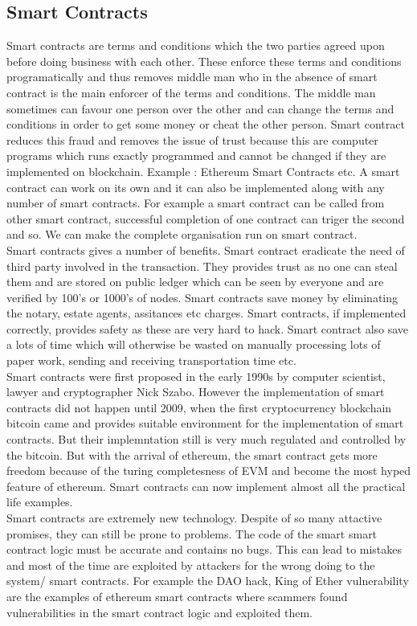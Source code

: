 \documentclass{article}
\begin{document}
\subsection*{Smart Contracts}
Smart contracts are terms and conditions which the two parties agreed upon before doing business with each other. These enforce these terms and conditions programatically and thus removes middle man who in the absence of smart contract is the main enforcer of the terms and conditions. The middle man sometimes can favour one person over the other and can change the terms and conditions in order to get some money or cheat the other person. Smart contract reduces this fraud and removes the issue of trust because this are computer programs which runs exactly programmed and cannot be changed if they are implemented on blockchain. Example : Ethereum Smart Contracts etc. A smart contract can work on its own and it can also be implemented along with any number of smart contracts. For example a smart contract can be called from other smart contract, successful completion of one contract can triger the second and so. We can make the complete organisation run on smart contract. \\
Smart contracts gives a number of benefits. Smart contract eradicate the need of third party involved in the transaction. They provides trust as no one can steal them and are stored on public ledger which can be seen by everyone and are verified by 100's or 1000's of nodes. Smart contracts save money by eliminating the notary, estate agents, assitances etc charges. Smart contracts, if implemented correctly, provides safety as these are very hard to hack. Smart contract also save a lots of time which will otherwise be wasted on manually processing lots of paper work,  sending and receiving transportation time etc.\\
Smart contracts were first proposed in the early 1990s by computer scientist, lawyer and cryptographer Nick Szabo. However the implementation of smart contracts did not happen until 2009, when the first cryptocurrency blockchain bitcoin came and provides suitable environment for the implementation of smart contracts. But their implemntation still is very much regulated and controlled by the bitcoin. But with the arrival of ethereum, the smart contract gets more freedom because of the turing completesness of EVM and become the most hyped feature of ethereum. Smart contracts can now implement almost all the practical life examples.\\
Smart contracts are extremely new technology. Despite of so many attactive promises, they can still be prone to problems. The code of the smart smart contract logic must be accurate and contains no bugs. This can lead to mistakes and most of the time are exploited by attackers for the wrong doing to the system/ smart contracts. For example the DAO hack, King of Ether vulnerability are the examples of ethereum smart contracts where scammers found vulnerabilities in the smart contract logic and exploited them.
\end{document}
